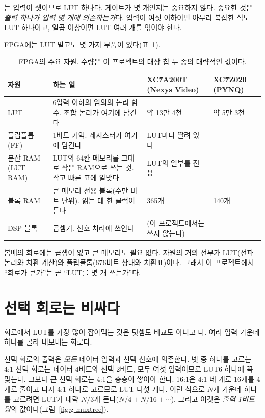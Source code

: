 \General {}는 입력이 셋이므로 LUT 하나다. 게이트가 몇 개인지는 중요하지 않다.
중요한 것은 \emph{출력 하나가 입력 몇 개에 의존하는가}다. 입력이 여섯 이하이면 아무리 복잡한 식도
LUT 하나이고, 일곱 이상이면 LUT 여러 개를 엮어야 한다.

FPGA에는 LUT 말고도 몇 가지 부품이 있다(표~\ref{tab:g-res}).

\begin{table}[ht]
\centering
\caption{FPGA의 주요 자원. 수량은 이 프로젝트의 대상 칩 두 종의 대략적인 값이다.}
\label{tab:g-res}
\small
\begin{tabularx}{\linewidth}{l>{\raggedright\arraybackslash}X>{\raggedright\arraybackslash}p{27mm}>{\raggedright\arraybackslash}p{24mm}}
\toprule
자원 & 하는 일 & XC7A200T (Nexys Video) & XC7Z020 (PYNQ) \\
\midrule
LUT & 6입력 이하의 임의의 논리 함수. 조합 논리가 여기에 담긴다 & 약 13만 4천 & 약 5만 3천 \\
플립플롭(FF) & 1비트 기억. 레지스터가 여기에 담긴다 & LUT마다 딸려 있다 & \\
분산 RAM (LUT RAM) & LUT의 64칸 메모리를 그대로 작은 RAM으로 쓰는 것. 작고 빠른 표에 알맞다 & LUT의 일부를 전용 & \\
블록 RAM & 큰 메모리 전용 블록(수만 비트 단위). 읽는 데 한 클럭이 든다 & 365개 & 140개 \\
DSP 블록 & 곱셈기. 신호 처리에 쓰인다 & (이 프로젝트에서는 쓰지 않는다) & \\
\bottomrule
\end{tabularx}
\end{table}

\Ours 봄베의 회로에는 곱셈이 없고 큰 메모리도 필요 없다. 자원의 거의 전부가 LUT(전파 논리와 치환 계산)와
플립플롭(676비트 상태와 치환표)이다. 그래서 이 프로젝트에서 ``회로가 큰가''는 곧 ``LUT를 몇 개 쓰는가''다.

\section{선택 회로는 비싸다}\label{sec:mux-cost}

회로에서 LUT를 가장 많이 잡아먹는 것은 덧셈도 비교도 아니고 다.
여러 입력 가운데 하나를 골라 내보내는 회로다.

\Why 선택 회로의 출력은 \emph{모든} 데이터 입력과 선택 신호에 의존한다. 넷 중 하나를 고르는 4:1 선택
회로는 데이터 4비트와 선택 2비트, 모두 여섯 입력이므로 LUT6 하나에 꼭 맞는다. 그보다 큰 선택 회로는
4:1을 층층이 쌓아야 한다. 16:1은 4:1 네 개로 16개를 4개로 줄이고 다시 4:1 하나로 고르므로 LUT 다섯 개다.
이런 식으로 $N$개 가운데 하나를 고르려면 LUT가 대략 $N/3$개 든다($N/4 + N/16 + \cdots$). 그리고 이것은
\emph{출력 1비트당}의 값이다(그림~\ref{fig:g-muxtree}).

